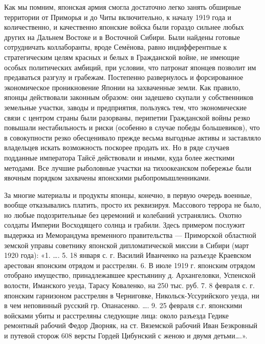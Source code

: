 Как мы помним, японская армия смогла достаточно легко занять обширные территории от Приморья и до Читы включительно, к началу 1919 года и количественно, и качественно японские войска были гораздо сильнее любых других на Дальнем Востоке и в Восточной Сибири. Были найдены готовые сотрудничать коллаборанты, вроде Семёнова, равно индифферентные к стратегическим целям красных и белых в Гражданской войне, не имеющие особых политических амбиций, при условии, что патронат японцев позволит им предаваться разгулу и грабежам. Постепенно развернулось и форсированное экономическое проникновение Японии на захваченные земли. Как правило, японцы действовали законным образом: они задешево скупали у собственников земельные участки, заводы и предприятия, пользуясь тем, что экономические связи с центром страны были разорваны, перипетии Гражданской войны резко повышали нестабильность и риски (особенно в случае победы большевиков), что в совокупности резко обесценивало прежде весьма выгодные активы и заставляло владельцев искать возможность поскорее продать их. Но в ряде случаев подданные императора Тайсё действовали и иными, куда более жесткими методами. Все лучшие рыболовные участки на тихоокеанском побережье были явочным порядком захвачены японскими рыбопромышленниками.

За многие материалы и продукты японцы, конечно, в первую очередь военные, вообще отказывались платить, просто их реквизируя. Массового террора не было, но любые подозрительные без церемоний и колебаний устранялись. Охотно солдаты Империи Восходящего солнца и грабили. Здесь примером послужит выдержка из Меморандума временного правительства — Приморской областной земской управы советнику японской дипломатической миссии в Сибири (март 1920 года): «1. …. 5. 18 января с. г. Василий Иванченко на разъезде Краевском арестован японским отрядом и расстрелян. 6. В июле 1919 г. японским отрядом отобрано имущество, принадлежавшее крестьянину д. Архангеловки, Успенской волости, Иманского уезда, Тарасу Коваленко, на 250 тыс. руб. 7. 8 февраля с. г. японским гарнизоном расстрелян в Черниговке, Никольск-Уссурийского уезда, ни в чем неповинный русский гр. Опанасенко. …. 9. 25 февраля с.г. японскими войсками убиты и расстреляны следующие лица: около разъезда Гедике ремонтный рабочий Федор Дворняк, на ст. Вяземской рабочий Иван Безкровный и путевой сторож 608 версты Гордей Цибунский с женою и двумя детьми….».

